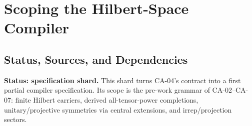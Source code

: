 
\section{Scoping the Hilbert-Space Compiler}
\label{sec:hilbert-space-compiler-spec}

\subsection{Status, Sources, and Dependencies}

\textbf{Status: specification shard.}  This shard turns CA-04's contract into a
first partial compiler specification.  Its scope is the pre-work grammar of
CA-02--CA-07: finite Hilbert carriers, derived all-tensor-power completions,
unitary/projective symmetries via central extensions, and irrep/projection sectors.


